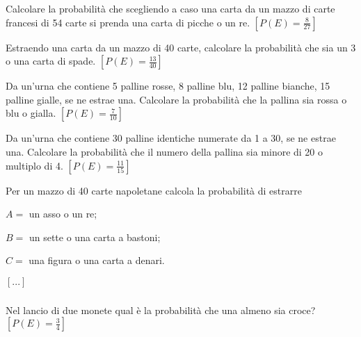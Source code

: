 \begin{esercizio}[\Ast]
 \label{ese:9.32}
Calcolare la probabilità che scegliendo a caso una carta da un mazzo di carte 
francesi di 54 carte si prenda una carta di picche o un re.
\hfill \(\left[P(E)=\frac 8{27}\right]\)
\end{esercizio}

\begin{esercizio}[\Ast]
 \label{ese:9.33}
Estraendo una carta da un mazzo di 40 carte, calcolare la probabilità che sia un 
3 o una carta di spade.
\hfill \(\left[P(E)=\frac{13}{40}\right]\)
\end{esercizio}

\begin{esercizio}[\Ast]
 \label{ese:9.34}
 Da un'urna che contiene 5 palline rosse, 8 palline blu, 12 palline bianche, 15 
palline gialle, se ne estrae una. Calcolare la probabilità che la pallina sia 
rossa o blu o gialla.
\hfill \(\left[P(E)=\frac 7{10}\right]\)
\end{esercizio}

\begin{esercizio}[\Ast]
 \label{ese:9.35}
Da un'urna che contiene 30 palline identiche numerate da 1 a 30, se ne estrae 
una. Calcolare la probabilità che il numero della pallina sia minore di 20 o 
multiplo di 4.
\hfill \(\left[P(E)=\frac{11}{15}\right]\)
\end{esercizio}

\begin{esercizio}
 \label{ese:9.36}
Per un mazzo di 40 carte napoletane calcola la probabilità di estrarre
\begin{itemize*}
\item \( A= \) un asso o un re;
\item \( B= \) un sette o una carta a bastoni;
\item \( C= \) una figura o una carta a denari.
\end{itemize*}
\hfill \(\left[...\right]\)
\end{esercizio}

\subsubsection*{}


\begin{esercizio}[\Ast]
 \label{ese:9.47}
Nel lancio di due monete qual è la probabilità che una almeno sia croce?
\hfill \(\left[P(E)=\frac 3 4\right]\)
\end{esercizio}

